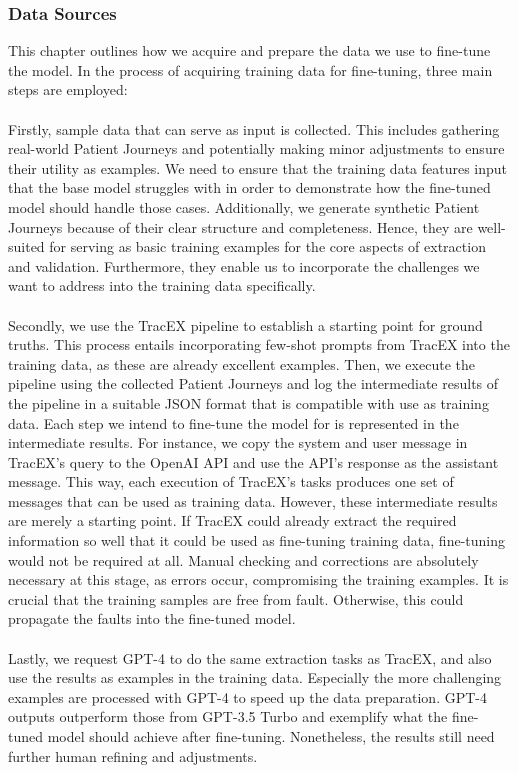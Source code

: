 \subsubsection{Data Sources}\label{sec:data_sources}
This chapter outlines how we acquire and prepare the data we use to fine-tune the model. In the process of acquiring training data for fine-tuning, three main steps are employed:\\\\
Firstly, sample data that can serve as input is collected. This includes gathering real-world Patient Journeys and potentially making minor adjustments to ensure their utility as examples. We need to ensure that the training data features input that the base model struggles with in order to demonstrate how the fine-tuned model should handle those cases. Additionally, we generate synthetic Patient Journeys because of their clear structure and completeness. Hence, they are well-suited for serving as basic training examples for the core aspects of extraction and validation. Furthermore, they enable us to incorporate the challenges we want to address into the training data specifically.\\\\
Secondly, we use the TracEX pipeline to establish a starting point for ground truths. This process entails incorporating few-shot prompts from TracEX into the training data, as these are already excellent examples. Then, we execute the pipeline using the collected Patient Journeys and log the intermediate results of the pipeline in a suitable JSON format that is compatible with use as training data. Each step we intend to fine-tune the model for is represented in the intermediate results. For instance, we copy the system and user message in TracEX's query to the OpenAI API and use the API's response as the assistant message. This way, each execution of TracEX's tasks produces one set of messages that can be used as training data. However, these intermediate results are merely a starting point. If TracEX could already extract the required information so well that it could be used as fine-tuning training data, fine-tuning would not be required at all. Manual checking and corrections are absolutely necessary at this stage, as errors occur, compromising the training examples. It is crucial that the training samples are free from fault. Otherwise, this could propagate the faults into the fine-tuned model. \\\\
Lastly, we request GPT-4 to do the same extraction tasks as TracEX, and also use the results as examples in the training data. Especially the more challenging examples are processed with GPT-4 to speed up the data preparation. GPT-4 outputs outperform those from GPT-3.5 Turbo and exemplify what the fine-tuned model should achieve after fine-tuning. Nonetheless, the results still need further human refining and adjustments.

